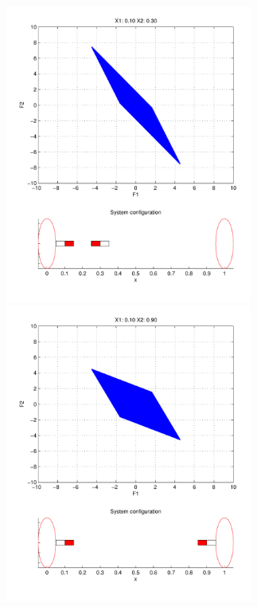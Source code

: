 \documentclass[english]{article}
\begin{document}
\begin{center}
\includegraphics[trim = 0 .5in 0 0,width=3.2in]{figures/Opposing_X1010X2030.pdf}\includegraphics[trim = 0 .5in 0 0,width=3.2in]{figures/Opposing_X1010X2090.pdf}\\

\end{center}
\end{document}
